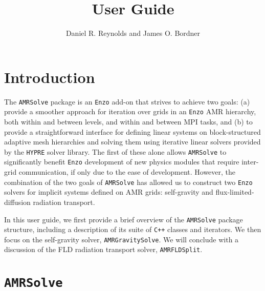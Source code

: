 \documentclass[letterpaper,10pt]{article}
\author{Daniel R. Reynolds and James O. Bordner}
\title{\amrsolve User Guide}
\renewcommand{\(}{\left(}
\renewcommand{\)}{\right)}
\newcommand{\amrsolve}{{\tt AMRSolve} }
\newcommand{\enzo}{{\tt Enzo} }
\newcommand{\hypre}{{\tt HYPRE} }
\newcommand{\cpp}{{\tt C++} }
\begin{document}
\maketitle

\section{Introduction}
\label{sec:intro}

The \amrsolve package is an \enzo add-on that strives to achieve two
goals: (a) provide a smoother approach for iteration over grids in an
\enzo AMR hierarchy, both within and between levels, and within and
between MPI tasks, and (b) to provide a straightforward interface for
defining linear systems on block-structured adaptive mesh hierarchies
and solving them using iterative linear solvers provided by the \hypre
solver library.  The first of these alone allows \amrsolve to
significantly benefit \enzo development of new physics modules that
require inter-grid communication, if only due to the ease of
development.  However, the combination of the two goals of \amrsolve
has allowed us to construct two \enzo solvers for implicit systems
defined on AMR grids: self-gravity and flux-limited-diffusion
radiation transport.

In this user guide, we first provide a brief overview of the \amrsolve
package structure, including a description of its suite of \cpp
classes and iterators.  We then focus on the self-gravity solver, 
{\tt AMRGravitySolve}. We will conclude with a discussion of the FLD
radiation transport solver, {\tt AMRFLDSplit}. 


\section{\amrsolve}
\label{sec:amrsolve}
\end{document}
